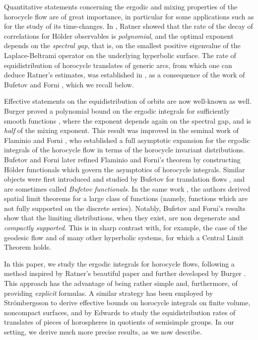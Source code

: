 \documentclass[JEP,XML,SOM,NoEqCountersInSection,Unicode,published]{cedram}
\theoremstyle{definition}
\begin{document}
Quantitative statements concerning the ergodic and mixing properties of the horocycle flow are of great importance, in particular for some applications such as for the study of its time-changes.
In \cite{Rat1}, Ratner showed that the rate of the decay of correlations for Hölder observables is \emph{polynomial}, and the optimal exponent depends on the \emph{spectral gap}, that is, on the smallest positive eigenvalue of the Laplace-Beltrami operator on the underlying hyperbolic surface. The rate of equidistribution of horocycle translates of generic arcs, from which one can deduce Ratner's estimates, was established in \cite{Rav}, as a consequence of the work of Bufetov and Forni \cite{BuFo}, which we recall below.

Effective statements on the equidistribution of orbits are now well-known as well.
Burger proved a polynomial bound on the ergodic integrals for sufficiently smooth functions \cite{Bur}, where the exponent depends again on the spectral gap, and is \emph{half} of the mixing exponent.
This result was improved in the seminal work of Flaminio and Forni \cite{FlaFo}, who established a full asymptotic expansion for the ergodic integrals of the horocycle flow in terms of the horocycle invariant distributions.
Bufetov and Forni \cite{BuFo} later refined Flaminio and Forni's theorem by constructing Hölder functionals which govern the asymptotics of horocycle integrals.
Similar objects were first introduced and studied by Bufetov for translation flows \cite{Buf}, and are sometimes called \emph{Bufetov functionals}.
In the same work \cite{BuFo}, the authors derived spatial limit theorems for a large class of functions (namely, functions which are not fully supported on the discrete series).
Notably, Bufetov and Forni's results show that the limiting distributions, when they exist, are non degenerate and \emph{compactly supported}. This is in sharp contrast with, for example, the case of the geodesic flow and of many other hyperbolic systems, for which a Central Limit Theorem holds.

In this paper, we study the ergodic integrals for horocycle flows, following a method inspired by Ratner's beautiful paper \cite{Rat1} and further developed by Burger \cite{Bur}. This approach has the advantage of being rather simple and, furthermore, of providing \emph{explicit} formulas. A similar strategy has been employed by Strömbergsson \cite{Str} to derive effective bounds on horocycle integrals on finite volume, noncompact surfaces, and by Edwards \cite{Edw} to study the equidistribution rates of translates of pieces of horospheres in quotients of semisimple groups. In our setting, we derive much more precise results, as we now describe.\enlargethispage{\baselineskip}
\end{document}
